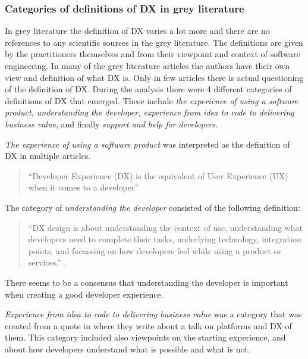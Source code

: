 \documentclass[english, 12pt, a4paper, sci, utf8, a-1b, online]{aaltothesis}
\begin{document}
\subsubsection{Categories of definitions of DX in grey literature}

In grey literature the definition of DX varies a lot more and there are no references to any scientific sources in the grey literature. The definitions are given by the practitioners themselves and from their viewpoint and context of software engineering. In many of the grey literature articles the authors have their own view and definition of what DX is. Only in few articles there is actual questioning of the definition of DX. During the analysis there were 4 different categories of definitions of DX that emerged. These include \textit{the experience of using a software product, understanding the developer, experience from idea to code to delivering business value}, and finally \textit{support and help for developers}.

\textit{The experience of using a software product} was interpreted as the definition of DX in multiple articles.

\begin{quote}
  ``Developer Experience (DX) is the equivalent of User Experience (UX) when it comes to a developer'' \parencite{the-best-practices-for-a-great-dx}
\end{quote}

\noindent The category of \textit{understanding the developer} consisted of the following definition:

\begin{quote}
  ``DX design is about understanding the context of use, understanding what developers need to complete their tasks, underlying technology, integration points, and focussing on how developers feel while using a product or services.'' \parencite{building-the-developer-experience-from-the-ground-up}.
\end{quote}

\noindent There seems to be a consensus that understanding the developer is important when creating a good developer experience.

\textit{Experience from idea to code to delivering business value} was a category that was created from a quote in \textcite{workflows-for-the-new-developer-experience} where they write about a talk on platforms and DX of them. This category included also viewpoints on the starting experience, and about how developers understand what is possible and what is not.
\end{document}
